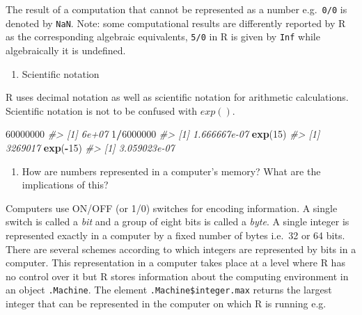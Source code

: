 \documentclass[
]{book}
\newenvironment{Shaded}{\begin{snugshade}}{\end{snugshade}}
\newcommand{\CommentTok}[1]{\textcolor[rgb]{0.56,0.35,0.01}{\textit{#1}}}
\newcommand{\DecValTok}[1]{\textcolor[rgb]{0.00,0.00,0.81}{#1}}
\newcommand{\FunctionTok}[1]{\textcolor[rgb]{0.13,0.29,0.53}{\textbf{#1}}}
\newcommand{\NormalTok}[1]{#1}
\newcommand{\SpecialCharTok}[1]{\textcolor[rgb]{0.81,0.36,0.00}{\textbf{#1}}}
\providecommand{\tightlist}{%
  \setlength{\itemsep}{0pt}\setlength{\parskip}{0pt}}
\begin{document}
The result of a computation that cannot be represented as a number e.g.~\texttt{0/0} is denoted by \texttt{NaN}.
Note: some computational results are differently reported by R as the corresponding algebraic equivalents, \texttt{5/0} in R is given by \texttt{Inf} while algebraically it is undefined.

\begin{enumerate}
\def\labelenumi{(\alph{enumi})}
\setcounter{enumi}{3}
\tightlist
\item
  Scientific notation
\end{enumerate}

R uses decimal notation as well as scientific notation for arithmetic calculations. Scientific notation is not to be confused with \(exp()\).

\begin{Shaded}
\begin{Highlighting}[]
\DecValTok{60000000}
\CommentTok{\#\textgreater{} [1] 6e+07}
\DecValTok{1}\SpecialCharTok{/}\DecValTok{6000000}
\CommentTok{\#\textgreater{} [1] 1.666667e{-}07}
\FunctionTok{exp}\NormalTok{(}\DecValTok{15}\NormalTok{)}
\CommentTok{\#\textgreater{} [1] 3269017}
\FunctionTok{exp}\NormalTok{(}\SpecialCharTok{{-}}\DecValTok{15}\NormalTok{)}
\CommentTok{\#\textgreater{} [1] 3.059023e{-}07}
\end{Highlighting}
\end{Shaded}

\begin{enumerate}
\def\labelenumi{(\alph{enumi})}
\setcounter{enumi}{4}
\tightlist
\item
  How are numbers represented in a computer's memory? What are the implications of this?
\end{enumerate}

Computers use ON/OFF (or 1/0) switches for encoding information. A single switch is called a \emph{{bit}} and a group of eight bits is called a \emph{{byte}}. A single integer is represented exactly in a computer by a fixed number of bytes i.e.~32 or 64 bits. There are several schemes according to which integers are represented by bits in a computer. This representation in a computer takes place at a level where R has no control over it but R stores information about the computing environment in an object \texttt{.Machine}. The element \texttt{.Machine\$integer.max} returns the largest integer that can be represented in the computer on which R is running e.g.

\begin{Shaded}
\end{Shaded}
\end{document}
